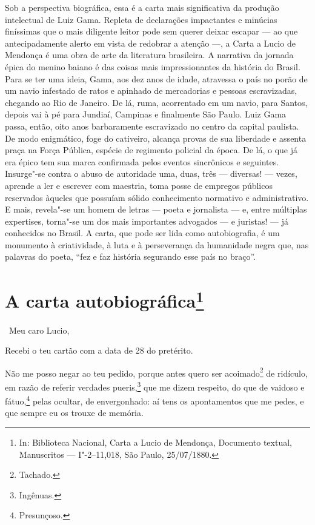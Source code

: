 {\small\noindent
Sob a perspectiva biográfica, essa é a carta mais significativa da
produção intelectual de Luiz Gama. Repleta de declarações impactantes e
minúcias finíssimas que o mais diligente leitor pode sem querer deixar
escapar --- ao que antecipadamente alerto em vista de redobrar a atenção
---, a Carta a Lucio de Mendonça é uma obra de arte da literatura
brasileira. A narrativa da jornada épica do menino baiano é das coisas
mais impressionantes da história do Brasil. Para se ter uma ideia, Gama,
aos dez anos de idade, atravessa o país no porão de um navio infestado
de ratos e apinhado de mercadorias e pessoas escravizadas, chegando ao
Rio de Janeiro. De lá, ruma, acorrentado em um navio, para Santos,
depois vai à pé para Jundiaí, Campinas e finalmente São Paulo. Luiz Gama
passa, então, oito anos barbaramente escravizado no centro da capital
paulista. De modo enigmático, foge do cativeiro, alcança provas de sua
liberdade e assenta praça na Força Pública, espécie de regimento
policial da época. De lá, o que já era épico tem sua marca confirmada
pelos eventos sincrônicos e seguintes. Insurge"-se contra o abuso de
autoridade uma, duas, três --- diversas! --- vezes, aprende a ler e
escrever com maestria, toma posse de empregos públicos reservados
àqueles que possuíam sólido conhecimento normativo e administrativo. E
mais, revela"-se um homem de letras --- poeta e jornalista --- e, entre
múltiplas expertises, torna"-se um dos mais importantes advogados --- e
juristas! --- já conhecidos no Brasil. A carta, que pode ser lida como
autobiografia, é um monumento à criatividade, à luta e à perseverança da
humanidade negra que, nas palavras do poeta, ``fez e faz história
segurando esse país no braço''. }


\chapter{A carta autobiográfica\footnote[*]{In: Biblioteca
  Nacional, Carta a Lucio de Mendonça, Documento textual, Manuscritos ---
  I"-2--11,018, São Paulo, 25/07/1880.}}


\noindent\ Meu caro Lucio,\smallskip

Recebi o teu cartão com a data de 28 do pretérito.

Não me posso negar ao teu pedido, porque antes quero ser
acoimado\footnote{Tachado.} de ridículo, em razão de referir verdades
pueris,\footnote{Ingênuas.} que me dizem respeito, do que de vaidoso e
fátuo,\footnote{Presunçoso.} pelas ocultar, de envergonhado: aí tens
os apontamentos que me pedes, e que sempre eu os trouxe de memória.

